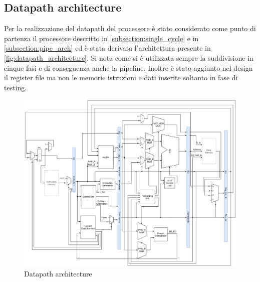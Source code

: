 \subsection{Datapath architecture}
Per la realizzazione del datapath del processore è stato considerato come punto di partenza il processore descritto in \autoref{subsection:single_cycle} e in \autoref{subsection:pipe_arch} ed è stata derivata l'architettura presente in \autoref{fig:datapath_architecture}. Si nota come si è utilizzata sempre la suddivisione in cinque fasi e di conseguenza anche la pipeline. Inoltre è stato aggiunto nel design il register file ma non le memorie istruzioni e dati inserite soltanto in fase di testing.

\begin{figure}[h]
  \center
  \includegraphics[width=1\textwidth]{sec2/images/datapath.png}
  \caption{Datapath architecture}
  \label{fig:datapath_architecture}
\end{figure}
